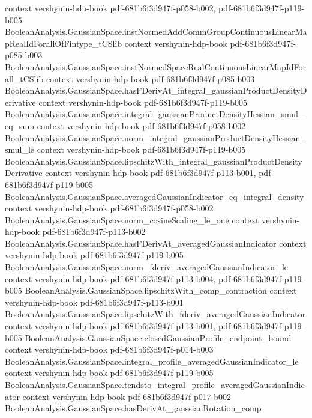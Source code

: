 \begin{theorem}
  {context}
  {vershynin-hdp-book}
  {pdf-681b6f3d947f-p058-b002,
    pdf-681b6f3d947f-p119-b005}
\proofstep
  {BooleanAnalysis.GaussianSpace.instNormedAddCommGroupContinuousLinearMapRealIdForallOfFintype_tCSlib}
  {context}
  {vershynin-hdp-book}
  {pdf-681b6f3d947f-p085-b003}
\proofstep
  {BooleanAnalysis.GaussianSpace.instNormedSpaceRealContinuousLinearMapIdForall_tCSlib}
  {context}
  {vershynin-hdp-book}
  {pdf-681b6f3d947f-p085-b003}
\proofstep
  {BooleanAnalysis.GaussianSpace.hasFDerivAt_integral_gaussianProductDensityDerivative}
  {context}
  {vershynin-hdp-book}
  {pdf-681b6f3d947f-p119-b005}
\proofstep
  {BooleanAnalysis.GaussianSpace.integral_gaussianProductDensityHessian_smul_eq_sum}
  {context}
  {vershynin-hdp-book}
  {pdf-681b6f3d947f-p058-b002}
\proofstep
  {BooleanAnalysis.GaussianSpace.norm_integral_gaussianProductDensityHessian_smul_le}
  {context}
  {vershynin-hdp-book}
  {pdf-681b6f3d947f-p119-b005}
\proofstep
  {BooleanAnalysis.GaussianSpace.lipschitzWith_integral_gaussianProductDensityDerivative}
  {context}
  {vershynin-hdp-book}
  {pdf-681b6f3d947f-p113-b001,
    pdf-681b6f3d947f-p119-b005}
\proofstep
  {BooleanAnalysis.GaussianSpace.averagedGaussianIndicator_eq_integral_density}
  {context}
  {vershynin-hdp-book}
  {pdf-681b6f3d947f-p058-b002}
\proofstep
  {BooleanAnalysis.GaussianSpace.norm_cosineScaling_le_one}
  {context}
  {vershynin-hdp-book}
  {pdf-681b6f3d947f-p113-b002}
\proofstep
  {BooleanAnalysis.GaussianSpace.hasFDerivAt_averagedGaussianIndicator}
  {context}
  {vershynin-hdp-book}
  {pdf-681b6f3d947f-p119-b005}
\proofstep
  {BooleanAnalysis.GaussianSpace.norm_fderiv_averagedGaussianIndicator_le}
  {context}
  {vershynin-hdp-book}
  {pdf-681b6f3d947f-p113-b004,
    pdf-681b6f3d947f-p119-b005}
\proofstep
  {BooleanAnalysis.GaussianSpace.lipschitzWith_comp_contraction}
  {context}
  {vershynin-hdp-book}
  {pdf-681b6f3d947f-p113-b001}
\proofstep
  {BooleanAnalysis.GaussianSpace.lipschitzWith_fderiv_averagedGaussianIndicator}
  {context}
  {vershynin-hdp-book}
  {pdf-681b6f3d947f-p113-b001,
    pdf-681b6f3d947f-p119-b005}
\proofstep
  {BooleanAnalysis.GaussianSpace.closedGaussianProfile_endpoint_bound}
  {context}
  {vershynin-hdp-book}
  {pdf-681b6f3d947f-p014-b003}
\proofstep
  {BooleanAnalysis.GaussianSpace.integral_profile_averagedGaussianIndicator_le}
  {context}
  {vershynin-hdp-book}
  {pdf-681b6f3d947f-p119-b005}
\proofstep
  {BooleanAnalysis.GaussianSpace.tendsto_integral_profile_averagedGaussianIndicator}
  {context}
  {vershynin-hdp-book}
  {pdf-681b6f3d947f-p017-b002}
\proofstep
  {BooleanAnalysis.GaussianSpace.hasDerivAt_gaussianRotation_comp}

\end{theorem}
